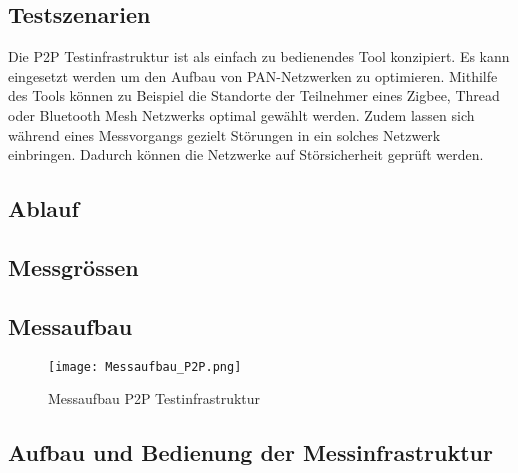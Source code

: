 \subsection{Testszenarien}\label{sec:TestszenarienP2P}

Die P2P Testinfrastruktur ist als einfach zu bedienendes Tool konzipiert. Es kann eingesetzt werden um den Aufbau von PAN-Netzwerken zu optimieren. Mithilfe des Tools können zu Beispiel die Standorte der Teilnehmer eines Zigbee, Thread oder Bluetooth Mesh Netzwerks optimal gewählt werden. Zudem lassen sich während eines Messvorgangs gezielt Störungen in ein solches Netzwerk einbringen. Dadurch können die Netzwerke auf Störsicherheit geprüft werden. 


\subsection{Ablauf}\label{sec:AblaufP2P}

\subsection{Messgrössen}\label{sec:MessgrössenP2P}

\subsection{Messaufbau}\label{sec:Messaufbau}

\begin{figure} [H]
	\centering
	\texttt{[image: Messaufbau\_P2P.png]}
	\caption{Messaufbau P2P Testinfrastruktur}
	\label{fig:MessaufbauP2P}
\end{figure}


\subsection{Aufbau und Bedienung der Messinfrastruktur}\label{sec:AufbauundBedienungderMessinfrastruktur}


